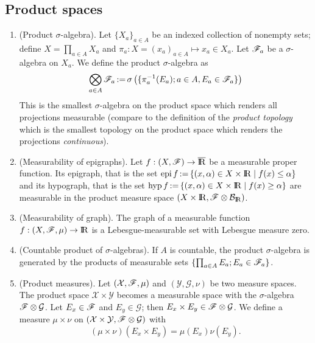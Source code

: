 \documentclass[a4paper,10pt]{article}
\begin{document}
\subsection{Product spaces}
\begin{enumerate}
 \item (Product $\sigma$-algebra). Let $\{X_a\}_{a\in A}$ be an indexed collection of nonempty sets; define 
       $X=\prod_{a\in A}X_a$ and $\pi_a: X = (x_a)_{a\in A} \mapsto x_a\in X_a$. Let $\mathscr{F}_a$ be a $\sigma$-algebra
       on $X_a$. We define the product $\sigma$-algebra as
       \[
        \bigotimes_{a\in A} \mathscr{F}_a {}\mathop{\mathrel{:}=}{} \sigma\left( \{\pi_a^{-1}(E_a);a\in A, E_a\in \mathscr{F}_a\}\right)
       \]
       This is the smallest $\sigma$-algebra on the product space which renders all projections measurable
       (compare to the definition of the \textit{product topology} which is the smallest topology on 
       the product space which renders the projections \textit{continuous}).
       
 \item (Measurability of epigraphs). Let $f:(X,\F)\to\barre$ be a measurable proper function. Its epigraph, that is
       the set $\epi f \dfn \{(x,\alpha)\in X\times \Re {}\mid{} f(x) \leq \alpha\}$ and its hypograph, that is
       the set $\hyp f \dfn \{(x,\alpha) \in X\times \Re {}\mid{} f(x) \geq \alpha\}$ are measurable in the product
       measure space $(X\times \Re, \F\otimes \B_\Re)$.
       
 \item (Measurability of graph). The graph of a measurable function $f:(X,\F,\mu)\to\Re$ is a Lebesgue-measurable set 
       with Lebesgue measure zero.
       
 \item (Countable product of $\sigma$-algebras). If $A$ is countable, the product $\sigma$-algebra       
       is generated by the products of measurable sets $\{\prod_{a\in A}E_a; E_a\in \mathscr{F}_a\}$.
       
 \item (Product measures). Let $(\mathcal{X},\mathscr{F},\mu)$ and $(\mathcal{Y},\mathcal{G},\nu)$ be two measure spaces.
       The product space $\mathcal{X}\times \mathcal{Y}$ becomes a measurable space with the $\sigma$-algebra 
       $\mathscr{F}\otimes \mathcal{G}$. Let $E_x\in\mathscr{F}$ and $E_y\in\mathcal{G}$; then $E_x\times E_y\in\mathscr{F}\otimes \mathcal{G}$.
       We define a measure $\mu\times\nu$ on $(\mathcal{X}\times \mathcal{Y}, \mathscr{F}\otimes\mathcal{G})$ with 
       \[
        (\mu\times \nu)(E_x\times E_y) = \mu(E_x) \nu(E_y).
       \]
       

\end{enumerate}
\end{document}
